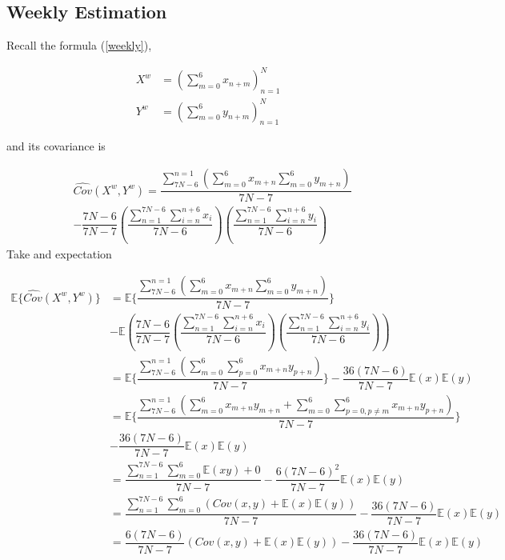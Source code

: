 \documentclass{article}[a4]
\begin{document}
\subsection{Weekly Estimation}
Recall the formula (\ref{weekly}),\par 
\begin{equation}
\begin{aligned}
X^{w}&=(\sum_{m=0}^{6}x_{n+m})_{n=1}^{N}\\
Y^{w}&=(\sum_{m=0}^{6}y_{n+m})_{n=1}^{N}
\end{aligned}
\end{equation}\par 
and its covariance is \par 
\begin{equation}
\begin{aligned}
&\hat{Cov}(X^{w},Y^{w}) = \dfrac{\sum_{7N-6}^{n=1}\left(\sum_{m=0}^{6}x_{m+n}\sum_{m=0}^{6}y_{m+n}\right)}{7N-7} \\
&-\dfrac{7N-6}{7N-7}\left(\dfrac{\sum_{n=1}^{7N-6}\sum_{i=n}^{n+6}x_{i}}{7N-6}\right)\left(\dfrac{\sum_{n=1}^{7N-6}\sum_{i=n}^{n+6}y_{i}}{7N-6}\right)
\end{aligned}
\end{equation}
Take and expectation\par 
\begin{equation}
\begin{aligned}
\mathbb{E}\{\hat{Cov}(X^{w},Y^{w}) \} &= \mathbb{E}\{\dfrac{\sum_{7N-6}^{n=1}\left(\sum_{m=0}^{6}x_{m+n}\sum_{m=0}^{6}y_{m+n}\right)}{7N-7}\} \\
&- \mathbb{E}\left(\dfrac{7N-6}{7N-7}\left(\dfrac{\sum_{n=1}^{7N-6}\sum_{i=n}^{n+6}x_{i}}{7N-6}\right)\left(\dfrac{\sum_{n=1}^{7N-6}\sum_{i=n}^{n+6}y_{i}}{7N-6}\right)\right)\\
&=\mathbb{E}\{\dfrac{\sum_{7N-6}^{n=1}\left(\sum_{m=0}^{6}\sum_{p=0}^{6}x_{m+n}y_{p+n}\right)}{7N-7}\}
-\dfrac{36(7N-6)}{7N-7}\mathbb{E}\left(x\right)\mathbb{E}\left(y\right)\\
&=\mathbb{E}\{\dfrac{\sum_{7N-6}^{n=1}\left(\sum_{m=0}^{6}x_{m+n}y_{m+n} + \sum_{m=0}^{6}\sum_{p=0,p\neq m}^{6}x_{m+n}y_{p+n}\right)}{7N-7}\}\\
&-\dfrac{36(7N-6)}{7N-7}\mathbb{E}\left(x\right)\mathbb{E}\left(y\right)\\
& = \dfrac{\sum_{n=1}^{7N-6}\sum_{m=0}^{6}\mathbb{E}(xy) + 0}{7N-7}-\dfrac{6(7N-6)^{2}}{7N-7}\mathbb{E}\left(x\right)\mathbb{E}\left(y\right)\\
& = \dfrac{\sum_{n=1}^{7N-6}\sum_{m=0}^{6}(Cov(x,y) + \mathbb{E}(x)\mathbb{E}(y))}{7N-7}
-\dfrac{36(7N-6)}{7N-7}\mathbb{E}\left(x\right)\mathbb{E}\left(y\right)\\
& = \dfrac{6(7N-6)}{7N-7}(Cov(x,y) + \mathbb{E}(x)\mathbb{E}(y))
-\dfrac{36(7N-6)}{7N-7}\mathbb{E}\left(x\right)\mathbb{E}\left(y\right)
\end{aligned}
\end{equation}
\end{document}
